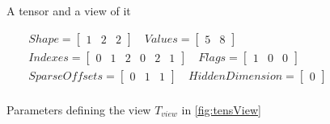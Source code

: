 \begin{figure}[!h]
	\centering
	\qquad
	\qquad


	\caption{A tensor and a view of it }
	\label{fig:example}
\end{figure}
	
\begin{figure}[!h]

		\[
		\begin{aligned}
		Shape = 
		\begin{bmatrix}
		1 & 2 & 2 
		\end{bmatrix}
		\quad
		Values = 
		\begin{bmatrix}
		5 & 8 
		\end{bmatrix}\\			
		Indexes = 
		\begin{bmatrix}
		0 &  1 & 2 & 0 & 2 & 1
		\end{bmatrix}		
		\quad	
		Flags = 
		\begin{bmatrix}
		1 & 0 & 0
		\end{bmatrix}\\			
		SparseOffsets = 
		\begin{bmatrix}
		0 &  1 & 1
		\end{bmatrix}
		\quad		
		HiddenDimension = 
		\begin{bmatrix}
		0 
		\end{bmatrix}\\			
		\end{aligned}
		\]
		\caption{Parameters defining the view $T_{view}$ in \ref{fig:tensView}}
		\label{eqn:viewParams}
\end{figure}

